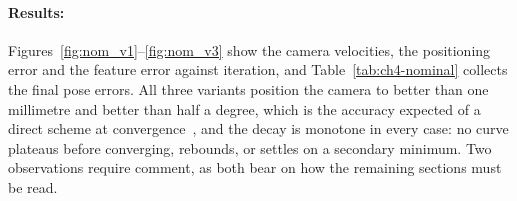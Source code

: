 \paragraph{Results:}
Figures~\ref{fig:nom_v1}--\ref{fig:nom_v3} show the camera velocities, the
positioning error and the feature error against iteration, and
Table~\ref{tab:ch4-nominal} collects the final pose errors. All three variants
position the camera to better than one millimetre and better than half a
degree, which is the accuracy expected of a direct scheme at
convergence~\cite{key?}, and the decay is monotone in every case: no curve
plateaus before converging, rebounds, or settles on a secondary minimum.
Two observations require comment, as both bear on how the remaining sections
must be read.


